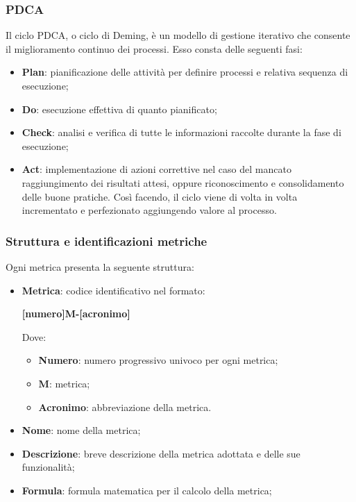 \subsubsection{PDCA}
Il ciclo PDCA, o ciclo di Deming, è un modello di gestione iterativo che consente il miglioramento continuo dei processi. Esso consta delle seguenti fasi:
\begin{itemize}
	\item \textbf{Plan}: pianificazione delle attività per definire processi e relativa sequenza di esecuzione;
	\item \textbf{Do}: esecuzione effettiva di quanto pianificato;
	\item \textbf{Check}: analisi e verifica di tutte le informazioni raccolte durante la fase di esecuzione;
	\item \textbf{Act}: implementazione di azioni correttive nel caso del mancato raggiungimento dei risultati attesi, oppure riconoscimento e
	      consolidamento delle buone pratiche. Così facendo, il ciclo viene di volta in volta incrementato e perfezionato aggiungendo valore al processo.
\end{itemize}

\subsubsection{Struttura e identificazioni metriche}
Ogni metrica presenta la seguente struttura:
\begin{itemize}
	\item \textbf{Metrica}:
	      codice identificativo nel formato:
	      \begin{center}
		      \textbf{[numero]M-[acronimo]}
	      \end{center}
	      Dove:
	      \begin{itemize}
		      \item \textbf{Numero}: numero progressivo univoco per ogni metrica;
		      \item \textbf{M}: metrica;
		      \item \textbf{Acronimo}: abbreviazione della metrica.
	      \end{itemize}
	\item \textbf{Nome}: nome della metrica;
	\item \textbf{Descrizione}: breve descrizione della metrica adottata e delle sue funzionalità;
	\item \textbf{Formula}: formula matematica per il calcolo della metrica;
\end{itemize}

